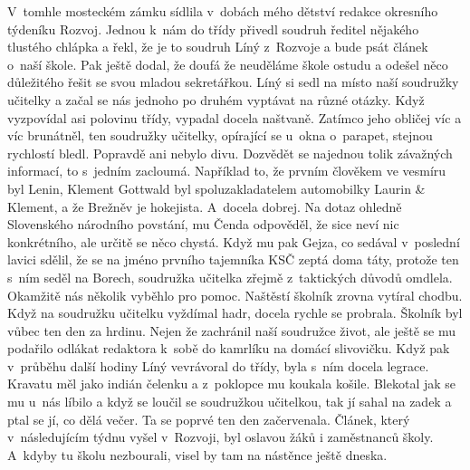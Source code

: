 
V~tomhle mosteckém zámku sídlila v~dobách mého dětství redakce
okresního týdeníku Rozvoj. Jednou k~nám do třídy přivedl soudruh
ředitel nějakého tlustého chlápka a řekl, že je to soudruh Líný
z~Rozvoje a bude psát článek o~naší škole. Pak ještě dodal, že doufá že
neuděláme škole ostudu a odešel něco důležitého řešit se svou mladou
sekretářkou. Líný si sedl na místo naší soudružky učitelky a začal se
nás jednoho po druhém vyptávat na různé otázky. Když vyzpovídal asi
polovinu třídy, vypadal docela naštvaně. Zatímco jeho obličej víc a
víc brunátněl, ten soudružky učitelky, opírající se u~okna o~parapet,
stejnou rychlostí bledl. Popravdě ani nebylo divu. Dozvědět se
najednou tolik závažných informací, to s~jedním zacloumá. Například
to, že prvním člověkem ve vesmíru byl Lenin, Klement Gottwald byl
spoluzakladatelem automobilky Laurin & Klement, a že Brežněv je
hokejista. A~docela dobrej. Na dotaz ohledně Slovenského národního
povstání, mu Čenda odpověděl, že sice neví nic konkrétního, ale určitě
se něco chystá. Když mu pak Gejza, co sedával v~poslední lavici
sdělil, že se na jméno prvního tajemníka KSČ zeptá doma táty, protože
ten s~ním seděl na Borech, soudružka učitelka zřejmě z~taktických
důvodů omdlela. Okamžitě nás několik vyběhlo pro pomoc. Naštěstí
školník zrovna vytíral chodbu. Když na soudružku učitelku vyždímal
hadr, docela rychle se probrala. Školník byl vůbec ten den za hrdinu.
Nejen že zachránil naší soudružce život, ale ještě se mu podařilo
odlákat redaktora k~sobě do kamrlíku na domácí slivovičku. Když pak
v~průběhu další hodiny Líný vevrávoral do třídy, byla s~ním docela
legrace. Kravatu měl jako indián čelenku a z~poklopce mu koukala
košile. Blekotal jak se mu u~nás líbilo a když se loučil se soudružkou
učitelkou, tak jí sahal na zadek a ptal se jí, co dělá večer. Ta se
poprvé ten den začervenala. Článek, který v~následujícím týdnu vyšel
v~Rozvoji, byl oslavou žáků i zaměstnanců školy. A~kdyby tu školu
nezbourali, visel by tam na nástěnce ještě dneska.
